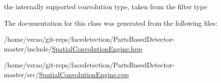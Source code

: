the internally supported convolution type, taken from the filter type 



The documentation for this class was generated from the following files\-:\begin{DoxyCompactItemize}
\item 
/home/vsrao/git-\/reps/facedetection/\-Parts\-Based\-Detector-\/master/include/\hyperlink{SpatialConvolutionEngine_8hpp}{Spatial\-Convolution\-Engine.\-hpp}\item 
/home/vsrao/git-\/reps/facedetection/\-Parts\-Based\-Detector-\/master/src/\hyperlink{SpatialConvolutionEngine_8cpp}{Spatial\-Convolution\-Engine.\-cpp}\end{DoxyCompactItemize}
